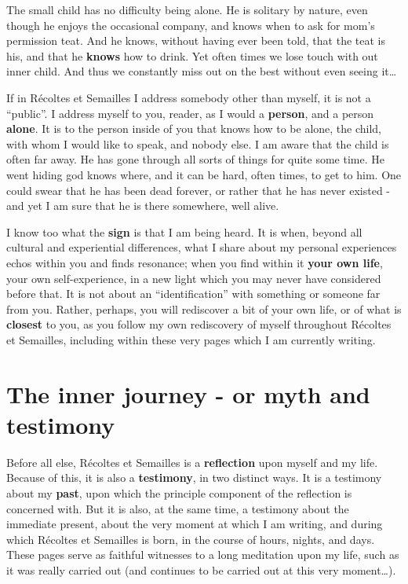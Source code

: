 The small child has no difficulty being alone. He is solitary by nature, even though he
enjoys the occasional company, and knows when to ask for mom's permission teat. And he
knows, without having ever been told, that the teat is his, and that he \textbf{knows}
how to drink. 
Yet often times we lose touch with out inner child. 
And thus we constantly miss out on the best 
without even seeing it\ldots

If in R\'ecoltes et Semailles I address somebody other than myself, it is not a
``public''. I address myself to you, reader, as I would a \textbf{person}, and a person
\textbf{alone}. 
It is to the person inside of you that knows how to be alone, the child, with whom I would
like to speak, and nobody else. 
I am aware that the child is often far away.
He has gone through all sorts of things for quite some time. 
He went hiding god knows where, and it can be hard, often times, to get to him.
One could swear that he has been dead forever, or rather that he has never existed - and
yet I am sure that he is there somewhere, well alive. 

I know too what the \textbf{sign} 
is that I am being heard. 
It is when, beyond all cultural and
experiential differences, what I share about my personal experiences echos within you and finds 
resonance; when you find within it \textbf{your own life}, your own self-experience, in a
new light which you may never have considered before that. It is not about an
``identification'' with something or someone far from you. 
Rather, perhaps, you will rediscover a bit of your own life, or of what is
\textbf{closest} to you, as you follow my own rediscovery of myself throughout 
R\'ecoltes et Semailles, 
including within these very pages which I am currently writing. 

\section{The inner journey - or myth and testimony}

Before all else, R\'ecoltes et Semailles
is a \textbf{reflection} upon myself and my life. 
Because of this, it is also a \textbf{testimony}, in two distinct ways. It is a testimony
about my \textbf{past}, upon which the principle component of the reflection is concerned
with. But it is also, at the same time, a testimony about the immediate present, about the
very moment at which I am writing, and during which R\'ecoltes et Semailles is born,
in the course of hours, nights, and days. 
These pages serve as faithful witnesses to a long meditation upon my life, such as it was
really carried out (and continues to be carried out at this very moment\ldots).

